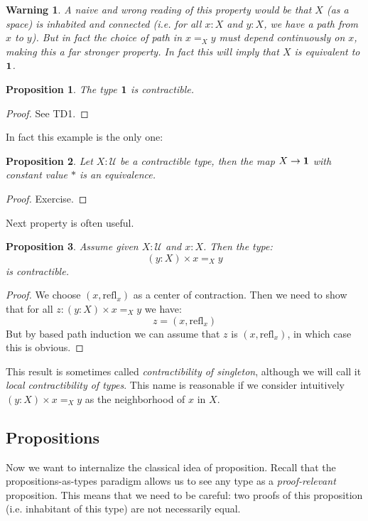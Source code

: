 \documentclass{article}
\newcommand{\sse}[1]{\medbreak \subsection{#1}}
\newcommand{\U}{{\mathcal U}}
\renewcommand{\r}{\rightarrow}
\newcommand{\refl}{\mathrm{refl}}
\newcommand{\one}{{\bf 1}}
\newtheorem{proposition}{Proposition}
\newtheorem{remark}{Remark}
\newtheorem{warning}{\danger Warning}
\begin{document}
\begin{warning}
A naive and wrong reading of this property would be that $X$ (as a space) is inhabited and connected (i.e. for all $x:X$ and $y:X$, we have a path from $x$ to $y$). But in fact the choice of path in $x=_X y$ must depend continuously on $x$, making this a far stronger property. In fact this will imply that $X$ is equivalent to $\one$.
\end{warning}

\begin{proposition}
The type $\one$ is contractible.
\end{proposition}
\begin{proof}
See TD1.
\end{proof}

In fact this example is the only one:

\begin{proposition}
Let $X:\U$ be a contractible type, then the map $X\r \one$ with constant value $*$ is an equivalence.
\end{proposition}
\begin{proof}
Exercise.
\end{proof}

Next property is often useful.

\begin{proposition}
Assume given $X:\U$ and $x:X$. Then the type: 
\[(y:X)\times x=_X y\]
is contractible.%
\end{proposition}
\begin{proof}
We choose $(x,\refl_x)$ as a center of contraction. Then we need to show that for all $z:(y:X)\times x=_X y$ we have: 
\[z=(x,\refl_x)\]
But by based path induction we can assume that $z$ is $(x,\refl_x)$, in which case this is obvious.
\end{proof}

This result is sometimes called \emph{contractibility of singleton}, although we will call it \emph{local contractibility of types}. This name is reasonable if we consider intuitively $(y:X)\times x=_X y$  as the neighborhood of $x$ in $X$. %



\sse{Propositions}

Now we want to internalize the classical idea of proposition. Recall that the propositions-as-types paradigm allows us to see any type as a \emph{proof-relevant} proposition. This means that we need to be careful: two proofs of this proposition (i.e. inhabitant of this type) are not necessarily equal. 
\end{document}
